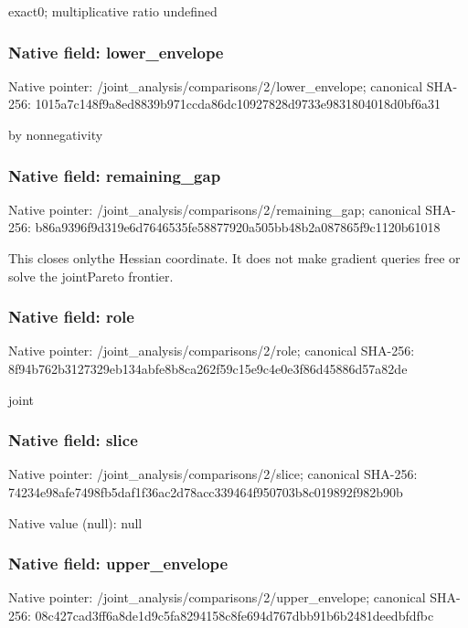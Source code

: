 \documentclass[10pt,a4paper]{article}
\begin{document}
\begingroup\raggedright\sloppy exact0;\allowbreak{} multiplicative ratio undefined\par\endgroup

\subsubsection{Native field: lower\_\allowbreak{}envelope}
Native pointer: /joint\_\allowbreak{}analysis/comparisons/2/lower\_\allowbreak{}envelope; canonical SHA-256: 1015a7c148f9a8ed8839b971ccda86dc10927828d9733e9831804018d0bf6a31

\begingroup\raggedright{} by nonnegativity\par\endgroup

\subsubsection{Native field: remaining\_\allowbreak{}gap}
Native pointer: /joint\_\allowbreak{}analysis/comparisons/2/remaining\_\allowbreak{}gap; canonical SHA-256: b86a9396f9d319e6d7646535fe58877920a505bb48b2a087865f9c1120b61018

\begingroup\raggedright\sloppy This closes onlythe Hessian coordinate. It does not make gradient queries free or solve the jointPareto frontier.\par\endgroup

\subsubsection{Native field: role}
Native pointer: /joint\_\allowbreak{}analysis/comparisons/2/role; canonical SHA-256: 8f94b762b3127329eb134abfe8b8ca262f59c15e9c4e0e3f86d45886d57a82de

\begingroup\raggedright\sloppy joint\par\endgroup

\subsubsection{Native field: slice}
Native pointer: /joint\_\allowbreak{}analysis/comparisons/2/slice; canonical SHA-256: 74234e98afe7498fb5daf1f36ac2d78acc339464f950703b8c019892f982b90b

Native value (null): null

\subsubsection{Native field: upper\_\allowbreak{}envelope}
Native pointer: /joint\_\allowbreak{}analysis/comparisons/2/upper\_\allowbreak{}envelope; canonical SHA-256: 08c427cad3ff6a8de1d9c5fa8294158c8fe694d767dbb91b6b2481deedbfdfbc
\end{document}
